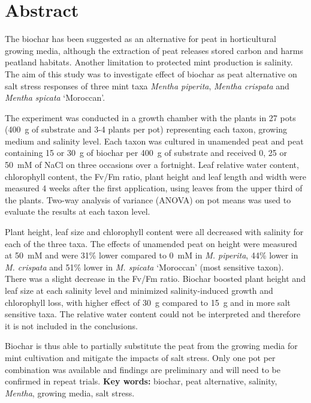 \chapter*{Abstract}

The biochar has been suggested as an alternative for peat in horticultural growing media, although the extraction of peat releases stored carbon and harms peatland habitats. Another limitation to protected mint production is salinity. The aim of this study was to investigate effect of biochar as peat alternative on salt stress responses of three mint taxa \textit{Mentha piperita}, \textit{Mentha crispata} and \textit{Mentha spicata} `Moroccan'.

The experiment was conducted in a growth chamber with the plants in 27 pots (400~g of substrate and 3-4 plants per pot) representing each taxon, growing medium and salinity level. Each taxon was cultured in unamended peat and peat containing 15 or 30~g of biochar per 400~g of substrate and received 0, 25 or 50~mM of NaCl on three occasions over a fortnight. Leaf relative water content, chlorophyll content, the Fv/Fm ratio, plant height and leaf length and width were measured 4 weeks after the first application, using leaves from the upper third of the plants. Two-way analysis of variance (ANOVA) on pot means was used to evaluate the results at each taxon level.

Plant height, leaf size and chlorophyll content were all decreased with salinity for each of the three taxa. The effects of unamended peat on height were measured at 50~mM and were 31\% lower compared to 0~mM in \textit{M. piperita}, 44\% lower in \textit{M. crispata} and 51\% lower in \textit{M. spicata} `Moroccan' (most sensitive taxon). There was a slight decrease in the Fv/Fm ratio. Biochar boosted plant height and leaf size at each salinity level and minimized salinity-induced growth and chlorophyll loss, with higher effect of 30~g compared to 15~g and in more salt sensitive taxa. The relative water content could not be interpreted and therefore it is not included in the conclusions.

Biochar is thus able to partially substitute the peat from the growing media for mint cultivation and mitigate the impacts of salt stress. Only one pot per combination was available and findings are preliminary and will need to be confirmed in repeat trials. \textbf{Key words:} biochar, peat alternative, salinity, \textit{Mentha}, growing media, salt stress.

\newpage
